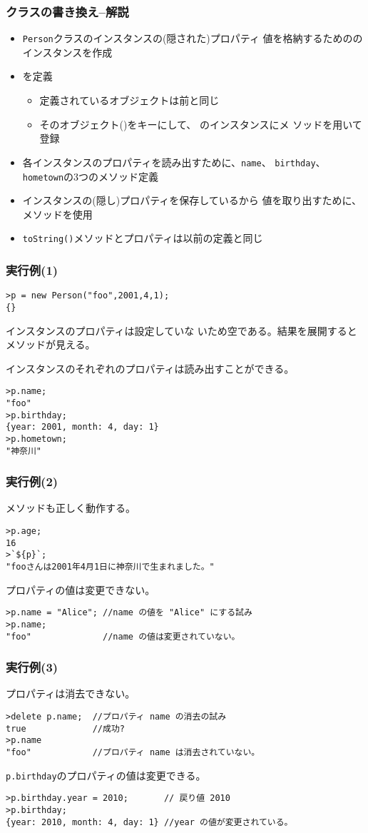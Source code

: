 \begin{frame}[containsverbatim]
 \frametitle{\protect{}クラスの書き換え--解説}
 \begin{itemize}
  \item \texttt{Person}クラスのインスタンスの(隠された)プロパティ
        値を格納するためののインスタンスを作成
  \item {}を定義
        \begin{itemize}
         \item 定義されているオブジェクトは前と同じ
         \item そのオブジェクト()をキーにして、
               のインスタンスにメ
               ソッドを用いて登録
        \end{itemize}
  \item 各インスタンスのプロパティを読み出すために、\texttt{name}、
        \texttt{birthday}、\texttt{hometown}の3つのメソッド定義
  \item インスタンスの(隠し)プロパティを保存しているから
        値を取り出すために、メソッドを使用
  \item \texttt{toString()}メソッドとプロパティは以前の定義と同じ
 \end{itemize}
\end{frame}
\begin{frame}[containsverbatim]
 \frametitle{実行例(1)}
\begin{Verbatim}
>p = new Person("foo",2001,4,1);
{}
\end{Verbatim}
インスタンスのプロパティは設定していな
 いため空である。結果を展開するとメソッドが見える。

インスタンスのそれぞれのプロパティは読み出すことができる。
\begin{Verbatim}
>p.name;
"foo"
>p.birthday;
{year: 2001, month: 4, day: 1}
>p.hometown;
"神奈川"
\end{Verbatim}
\end{frame}
\begin{frame}[containsverbatim]
 \frametitle{実行例(2)}
 メソッドも正しく動作する。
\begin{Verbatim}
>p.age;
16
>`${p}`;
"fooさんは2001年4月1日に神奈川で生まれました。"
\end{Verbatim}
プロパティの値は変更できない。
\begin{Verbatim}
>p.name = "Alice"; //name の値を "Alice" にする試み
>p.name;
"foo"              //name の値は変更されていない。
\end{Verbatim}
\end{frame}
\begin{frame}[containsverbatim]
 \frametitle{実行例(3)}
プロパティは消去できない。
\begin{Verbatim}
>delete p.name;  //プロパティ name の消去の試み
true             //成功?
>p.name
"foo"            //プロパティ name は消去されていない。
\end{Verbatim}
 \texttt{p.birthday}のプロパティの値は変更できる。
\begin{Verbatim}
>p.birthday.year = 2010;       // 戻り値 2010
>p.birthday;
{year: 2010, month: 4, day: 1} //year の値が変更されている。
\end{Verbatim}
\end{frame}
